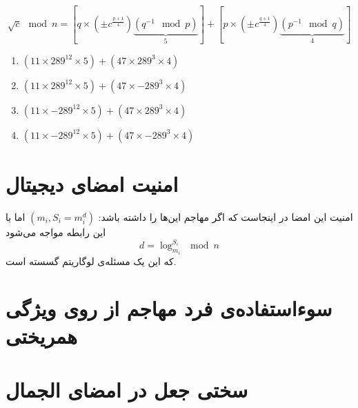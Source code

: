 \documentclass{article}
\begin{document}
\begin{latin}
\begin{equation*}
\sqrt{c} \mod n = \left[q\times(\pm c^{\frac{p+1}{4}})\underbrace{(q^{-1} \mod p)}_{5}\right] + \left[p\times(\pm c^{\frac{q+1}{4}})\underbrace{(p^{-1} \mod q)}_{4}\right]
\end{equation*}

\begin{enumerate}
\item $(11\times289^{12}\times5) + (47\times289^{3}\times4)$
\item $(11\times289^{12}\times5) + (47\times-289^{3}\times4)$
\item $(11\times-289^{12}\times5) + (47\times289^{3}\times4)$
\item $(11\times-289^{12}\times5) + (47\times-289^{3}\times4)$
\end{enumerate}
\end{latin}

\section{امنیت امضای دیجیتال }
امنیت این امضا در اینجاست که اگر مهاجم این‌ها را داشته باشد:
$(m_i, S_i = m^{d}_{i})$
اما با این رابطه مواجه می‌شود
\[
d = \log^{S_i}_{m_i} \mod n
\]
که این یک مسئله‌ی لوگاریتم گسسته است.
\section{سوء‌استفاده‌ی فرد مهاجم از روی ویژگی همریختی }

\section{سختی جعل در امضای الجمال}
\end{document}
